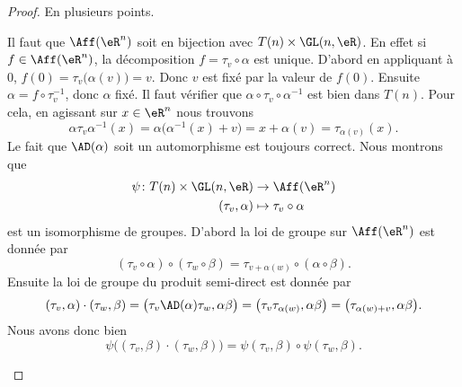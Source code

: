 \begin{proof}
	En plusieurs points.
	\begin{subproof}
		Il faut que \( \Aff(\eR^n)\) soit en bijection avec \( T(n)\times \GL(n,\eR)\). En effet si \( f\in \Aff(\eR^n)\), la décomposition \(f=\tau_v\circ\alpha \) est unique. D'abord en appliquant à \( 0\), \( f(0)=\tau_v\big( \alpha(v) \big)=v\). Donc \( v\) est fixé par la valeur de \( f(0)\). Ensuite \( \alpha=f\circ\tau_v^{-1}\), donc \( \alpha \) fixé.
		Il faut vérifier que \( \alpha\circ\tau_v\circ\alpha^{-1}\) est bien dans \( T(n)\). Pour cela, en agissant sur \( x\in \eR^n\) nous trouvons
		\begin{equation}
			\alpha\tau_v\alpha^{-1}(x)=\alpha\big( \alpha^{-1}(x)+v \big)=x+\alpha(v)=\tau_{\alpha(v)}(x).
		\end{equation}
		Le fait que \( \AD(\alpha)\) soit un automorphisme est toujours correct.
		\spitem[Morphisme]
		Nous montrons que
		\begin{equation}
			\begin{aligned}
				\psi\colon T(n)\times \GL(n,\eR) & \to \Aff(\eR^n)            \\
				(\tau_v,\alpha)                  & \mapsto \tau_v\circ \alpha
			\end{aligned}
		\end{equation}
		est un isomorphisme de groupes. D'abord la loi de groupe sur \( \Aff(\eR^n)\) est donnée par
		\begin{equation}
			(\tau_v\circ \alpha)\circ(\tau_w\circ\beta)=\tau_{v+\alpha(w)}\circ(\alpha\circ\beta).
		\end{equation}
		Ensuite la loi de groupe du produit semi-direct est donnée par
		\begin{equation}
			(\tau_v,\alpha)\cdot(\tau_w,\beta)=\big( \tau_v\AD(\alpha)\tau_w,\alpha\beta \big)=\big( \tau_v\tau_{\alpha(w)},\alpha\beta \big)=\big( \tau_{\alpha(w)+v},\alpha\beta \big).
		\end{equation}
		Nous avons donc bien
		\begin{equation}
			\psi\big( (\tau_v,\beta)\cdot(\tau_w,\beta) \big)=\psi(\tau_v,\beta)\circ\psi(\tau_w,\beta).
		\end{equation}
	\end{subproof}
\end{proof}

